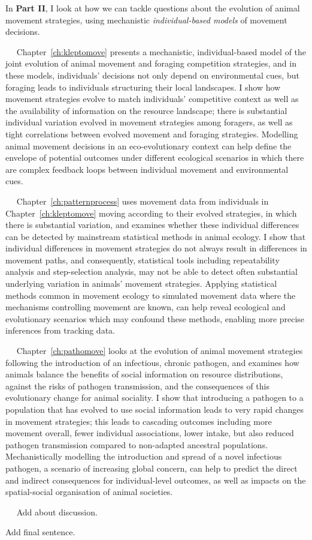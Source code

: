 \medskip

\noindent In \textbf{Part II}, I look at how we can tackle questions about the evolution of animal movement strategies, using mechanistic \textit{individual-based models} of movement decisions.

\adftripleflourishright~~ Chapter~\ref{ch:kleptomove} presents a mechanistic, individual-based model of the joint evolution of animal movement and foraging competition strategies, and in these models, individuals' decisions not only depend on environmental cues, but foraging leads to individuals structuring their local landscapes.
I show how movement strategies evolve to match individuals' competitive context as well as the availability of information on the resource landscape; there is substantial individual variation evolved in movement strategies among foragers, as well as tight correlations between evolved movement and foraging strategies.
Modelling animal movement decisions in an eco-evolutionary context can help define the envelope of potential outcomes under different ecological scenarios in which there are complex feedback loops between individual movement and environmental cues.

\adftripleflourishright~~ Chapter~\ref{ch:patternprocess} uses movement data from individuals in Chapter~\ref{ch:kleptomove} moving according to their evolved strategies, in which there is substantial variation, and examines whether these individual differences can be detected by mainstream statistical methods in animal ecology.
I show that individual differences in movement strategies do not always result in differences in movement paths, and consequently, statistical tools including repeatability analysis and step-selection analysis, may not be able to detect often substantial underlying variation in animals' movement strategies.
Applying statistical methods common in movement ecology to simulated movement data where the mechanisms controlling movement are known, can help reveal ecological and evolutionary scenarios which may confound these methods, enabling more precise inferences from tracking data.

\adftripleflourishright~~ Chapter~\ref{ch:pathomove} looks at the evolution of animal movement strategies following the introduction of an infectious, chronic pathogen, and examines how animals balance the benefits of social information on resource distributions, against the risks of pathogen transmission, and the consequences of this evolutionary change for animal sociality.
I show that introducing a pathogen to a population that has evolved to use social information leads to very rapid changes in movement strategies; this leads to cascading outcomes including more movement overall, fewer individual associations, lower intake, but also reduced pathogen transmission compared to non-adapted ancestral populations.
Mechanistically modelling the introduction and spread of a novel infectious pathogen, a scenario of increasing global concern, can help to predict the direct and indirect consequences for individual-level outcomes, as well as impacts on the spatial-social organisation of animal societies.

\adftripleflourishright~~ Add about discussion.

\medskip

\noindent Add final sentence.

\endgroup

\vfill

\cleardoublepage
